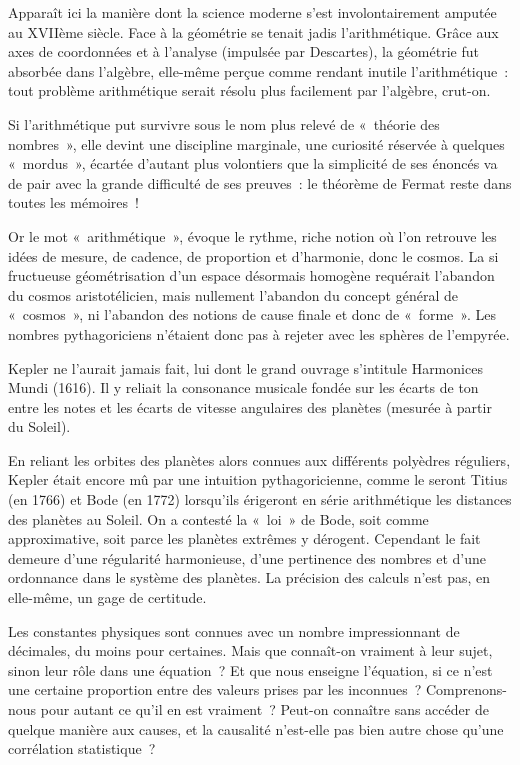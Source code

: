 \documentclass[a4paper,12pt]{article}
\begin{document}
Apparaît ici la manière dont la science moderne s’est involontairement amputée au XVIIème siècle. Face à la géométrie se tenait jadis l’arithmétique. Grâce aux axes de coordonnées et à l’analyse (impulsée par Descartes), la géométrie fut absorbée dans l’algèbre, elle-même perçue comme rendant inutile l’arithmétique : tout problème arithmétique serait résolu plus facilement par l’algèbre, crut-on. 

Si l’arithmétique put survivre sous le nom plus relevé de « théorie des nombres », elle devint une discipline marginale, une curiosité réservée à quelques « mordus », écartée d’autant plus volontiers que la simplicité de ses énoncés va de pair avec la grande difficulté de ses preuves : le théorème de Fermat reste dans toutes les mémoires !

Or le mot « arithmétique », évoque le rythme, riche notion où l’on retrouve les idées de mesure, de cadence, de proportion et d’harmonie, donc le cosmos. La si fructueuse géométrisation d’un espace désormais homogène requérait l’abandon du cosmos aristotélicien, mais nullement l’abandon du concept général de « cosmos », ni l’abandon des notions de cause finale et donc de « forme ». Les nombres pythagoriciens n’étaient donc pas à rejeter avec les sphères de l’empyrée. 

Kepler ne l’aurait jamais fait, lui dont le grand ouvrage s’intitule Harmonices Mundi (1616). Il y reliait la consonance musicale fondée sur les écarts de ton entre les notes et les écarts de vitesse angulaires des planètes (mesurée à partir du Soleil). 

En reliant les orbites des planètes alors connues aux différents polyèdres réguliers, Kepler était encore mû par une intuition pythagoricienne, comme le seront Titius (en 1766) et Bode (en 1772) lorsqu’ils érigeront en série arithmétique les distances des planètes au Soleil. On a contesté la « loi » de Bode, soit comme approximative, soit parce les planètes extrêmes y dérogent. Cependant le fait demeure d’une régularité harmonieuse, d’une pertinence des nombres et d’une ordonnance dans le système des planètes. La précision des calculs n'est pas, en elle-même, un gage de certitude. 

Les constantes physiques sont connues avec un nombre impressionnant de décimales, du moins pour certaines. Mais que connaît-on vraiment à leur sujet, sinon leur rôle dans une équation ? Et que nous enseigne l'équation, si ce n'est une certaine proportion entre des valeurs prises par les inconnues ? Comprenons-nous pour autant ce qu'il en est vraiment ? Peut-on connaître sans accéder de quelque manière aux causes, et la causalité n’est-elle pas bien autre chose qu’une corrélation statistique ? 
\end{document}
